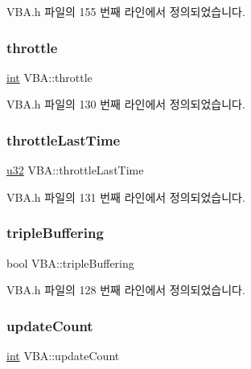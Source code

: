 V\+B\+A.\+h 파일의 155 번째 라인에서 정의되었습니다.

\mbox{\label{class_v_b_a_af21b98509a2589b38e4787f065b40a2b}} 
\subsubsection{\texorpdfstring{throttle}{throttle}}
{\footnotesize\ttfamily \mbox{\hyperlink{_util_8cpp_a0ef32aa8672df19503a49fab2d0c8071}{int}} V\+B\+A\+::throttle}



V\+B\+A.\+h 파일의 130 번째 라인에서 정의되었습니다.

\mbox{\label{class_v_b_a_ae66aa4e61c40718518c617dcc21516bf}} 
\subsubsection{\texorpdfstring{throttle\+Last\+Time}{throttleLastTime}}
{\footnotesize\ttfamily \mbox{\hyperlink{_system_8h_a10e94b422ef0c20dcdec20d31a1f5049}{u32}} V\+B\+A\+::throttle\+Last\+Time}



V\+B\+A.\+h 파일의 131 번째 라인에서 정의되었습니다.

\mbox{\label{class_v_b_a_af597e2c2466efdc6365a5d725651b855}} 
\subsubsection{\texorpdfstring{triple\+Buffering}{tripleBuffering}}
{\footnotesize\ttfamily bool V\+B\+A\+::triple\+Buffering}



V\+B\+A.\+h 파일의 128 번째 라인에서 정의되었습니다.

\mbox{\label{class_v_b_a_a61d96a23607a428ad97f74f4b750fcc2}} 
\subsubsection{\texorpdfstring{update\+Count}{updateCount}}
{\footnotesize\ttfamily \mbox{\hyperlink{_util_8cpp_a0ef32aa8672df19503a49fab2d0c8071}{int}} V\+B\+A\+::update\+Count}



